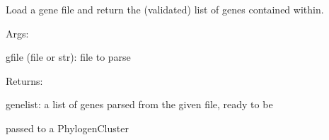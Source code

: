 \documentclass[letterpaper,10pt,english]{sphinxmanual}
\begin{document}
\begin{fulllineitems}
\label{doctree/soprano.analyse.phylogen.genes:soprano.analyse.phylogen.genes.load_genefile}
Load a gene file and return the (validated) list of genes contained
within.

\begin{DUlineblock}{0em}
\item[] Args:
\item[]
\begin{DUlineblock}{\DUlineblockindent}
\item[] gfile (file or str): file to parse
\end{DUlineblock}
\end{DUlineblock}

\begin{DUlineblock}{0em}
\item[] Returns:
\item[]
\begin{DUlineblock}{\DUlineblockindent}
\item[] genelist: a list of genes parsed from the given file, ready to be
\item[]
\begin{DUlineblock}{\DUlineblockindent}
\item[] passed to a PhylogenCluster
\end{DUlineblock}
\end{DUlineblock}
\end{DUlineblock}

\end{fulllineitems}


\begin{fulllineitems}
\label{doctree/soprano.analyse.phylogen.genes:soprano.analyse.phylogen.genes.parsegene_coord_histogram}
\end{fulllineitems}


\begin{fulllineitems}
\label{doctree/soprano.analyse.phylogen.genes:soprano.analyse.phylogen.genes.parsegene_energy}
\end{fulllineitems}
\end{document}
